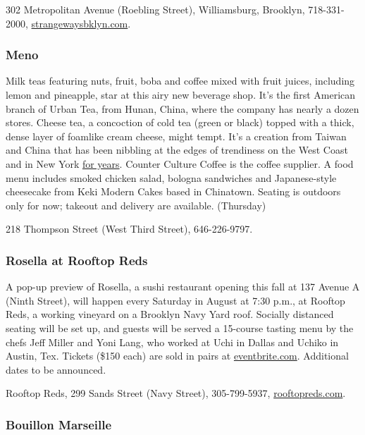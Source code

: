 302 Metropolitan Avenue (Roebling Street), Williamsburg, Brooklyn,
718-331-2000, \href{http://strangewaysbklyn.com/}{strangewaysbklyn.com}.

\hypertarget{meno-}{%
\subsubsection{Meno }\label{meno-}}

Milk teas featuring nuts, fruit, boba and coffee mixed with fruit
juices, including lemon and pineapple, star at this airy new beverage
shop. It's the first American branch of Urban Tea, from Hunan, China,
where the company has nearly a dozen stores. Cheese tea, a concoction of
cold tea (green or black) topped with a thick, dense layer of foamlike
cream cheese, might tempt. It's a creation from Taiwan and China that
has been nibbling at the edges of trendiness on the West Coast and in
New York
\href{https://www.nytimes3xbfgragh.onion/2018/12/21/dining/food-trends-predictions-2019.html}{for
years}. Counter Culture Coffee is the coffee supplier. A food menu
includes smoked chicken salad, bologna sandwiches and Japanese-style
cheesecake from Keki Modern Cakes based in Chinatown. Seating is
outdoors only for now; takeout and delivery are available. (Thursday)

218 Thompson Street (West Third Street), 646-226-9797.

\hypertarget{rosella-at-rooftop-reds}{%
\subsubsection{Rosella at Rooftop Reds}\label{rosella-at-rooftop-reds}}

A pop-up preview of Rosella, a sushi restaurant opening this fall at 137
Avenue A (Ninth Street), will happen every Saturday in August at 7:30
p.m., at Rooftop Reds, a working vineyard on a Brooklyn Navy Yard roof.
Socially distanced seating will be set up, and guests will be served a
15-course tasting menu by the chefs Jeff Miller and Yoni Lang, who
worked at Uchi in Dallas and Uchiko in Austin, Tex. Tickets (\$150 each)
are sold in pairs at
\href{https://www.eventbrite.com/e/rosella-sushi-at-rooftop-reds-tickets-115418023415}{eventbrite.com}.
Additional dates to be announced.

Rooftop Reds, 299 Sands Street (Navy Street), 305-799-5937,
\href{http://www.rooftopreds.com/}{rooftopreds.com}.

\hypertarget{bouillon-marseille-}{%
\subsubsection{Bouillon Marseille }\label{bouillon-marseille-}}

